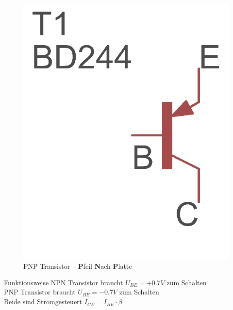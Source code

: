 \begin{frame}
\begin{minipage}{0.4\textwidth}
\begin{figure}
      \includegraphics[width=\textwidth,height=.4\textheight,keepaspectratio]{e13/PNP.png}
      \caption{PNP Transistor -- \textbf{P}feil \textbf{N}ach \textbf{P}latte}
    \end{figure}
  \end{minipage}

  \begin{center}
    \begin{block}{Funktionsweise}
      NPN Transistor braucht $ U_{BE}=+0.7V$ zum Schalten\\
      PNP Transistor braucht $ U_{BE}=-0.7V$ zum Schalten\\
      Beide sind Stromgesteuert $I_{CE} = I_{BE} \cdot \beta$
    \end{block}
  \end{center}
\end{frame}

